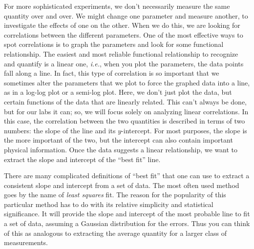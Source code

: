 For more sophisticated experiments, we don't necessarily measure the same 
quantity over and over. We might change one parameter and measure another, to 
investigate the effects of one on the other. When we do this, we are looking 
for correlations between the different parameters. One of the most effective 
ways to spot correlations is to graph the parameters and look for some 
functional relationship. The easiest and most reliable functional relationship 
to recognize and quantify is a linear one, {\it i.e.}, when you plot the 
parameters, the data points fall along a line. In fact, this type of 
correlation is so important that we sometimes alter the parameters that we 
plot to force the graphed data into a line, as in a log-log plot or a semi-log 
plot. Here, we don't just plot the data, but certain functions of the data 
that are linearly related. This can't always be done, but for our labs it can; 
so, we will focus solely on analyzing linear correlations. In this case, the 
correlation between the two quantities is described in terms of two numbers: 
the slope of the line and its $y$-intercept. For most purposes, the slope is 
the more important of the two, but the intercept can also contain important 
physical information. Once the data suggests a linear relationship, we want to 
extract the slope and intercept of the ``best fit'' line.

There are many complicated definitions of  ``best fit'' that one can use to 
extract a consistent slope and intercept from a set of data. The most often 
used method goes by the name of {\em least squares} fit. The reason for the 
popularity of this particular method has to do with its relative simplicity 
and statistical significance. It will provide the slope and intercept of the 
most probable line to fit a set of data, assuming a Gaussian distribution for 
the errors. Thus you can think of this as analogous to extracting the average 
quantity for a larger class of measurements.

